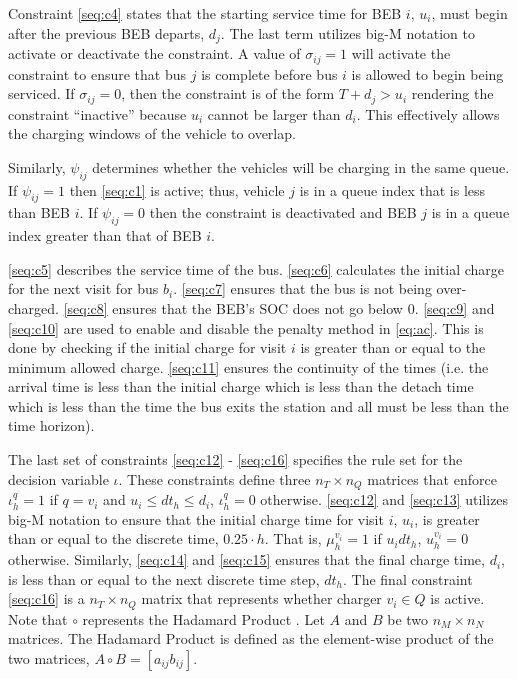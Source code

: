 \documentclass[11pt,a4paper,final]{article}
\newcommand{\Qset}{Q}                       %
\begin{document}
Constraint \ref{seq:c4} states that the starting service time for BEB \(i\), \(u_i\), must begin after the previous BEB
departs, \(d_j\). The last term utilizes big-M notation to activate or deactivate the constraint. A value of \(\sigma_{ij} = 1\)
will activate the constraint to ensure that bus \(j\) is complete before bus \(i\) is allowed to begin being serviced. If
\(\sigma_{ij} = 0\), then the constraint is of the form \(T + d_j > u_i\) rendering the constraint ``inactive'' because \(u_i\)
cannot be larger than \(d_i\). This effectively allows the charging windows of the vehicle to overlap.

Similarly, \(\psi_{ij}\) determines whether the vehicles will be charging in the same queue. If \(\psi_{ij} = 1\) then
\eqref{seq:c1} is active; thus, vehicle \(j\) is in a queue index that is less than BEB \(i\). If \(\psi_{ij} = 0\) then the
constraint is deactivated and BEB \(j\) is in a queue index greater than that of BEB \(i\).

\ref{seq:c5} describes the service time of the bus. \ref{seq:c6} calculates the initial charge for the next visit for
bus \(b_i\). \ref{seq:c7} ensures that the bus is not being over-charged. \ref{seq:c8} ensures that the BEB's SOC does not
go below 0. \ref{seq:c9} and \ref{seq:c10} are used to enable and disable the penalty method in \ref{eq:ac}. This is done by
checking if the initial charge for visit \(i\) is greater than or equal to the minimum allowed charge. \ref{seq:c11}
ensures the continuity of the times (i.e. the arrival time is less than the initial charge which is less than the detach
time which is less than the time the bus exits the station and all must be less than the time horizon).

The last set of constraints \ref{seq:c12} - \ref{seq:c16} specifies the rule set for the decision variable \(\iota\). These
constraints define three \(n_T \times n_Q\) matrices that enforce \(\iota_h^q = 1\) if \(q = v_i\) and \(u_i \le dt_h \le d_i\), \(\iota_h^q = 0\)
otherwise. \ref{seq:c12} and \ref{seq:c13} utilizes big-M notation to ensure that the initial charge time for visit \(i\),
\(u_i\), is greater than or equal to the discrete time, \(0.25 \cdot h\). That is, \(\mu_h^{v_i} = 1\) if \(u_i dt_h\), \(u_h^{v_i} =
0\) otherwise. Similarly, \ref{seq:c14} and \ref{seq:c15} ensures that the final charge time, \(d_i\), is less than or
equal to the next discrete time step, \(dt_h\). The final constraint \ref{seq:c16} is a \(n_T \times n_Q\) matrix that represents
whether charger \(v_i \in \Qset\) is active. Note that \(\circ\) represents the Hadamard Product \cite{horn-1985-matrix-analy}.
Let \(A\) and \(B\) be two \(n_M \times n_N\) matrices. The Hadamard Product is defined as the element-wise product of the two
matrices, \(A \circ B = [a_{ij}b_{ij}]\).
\end{document}
